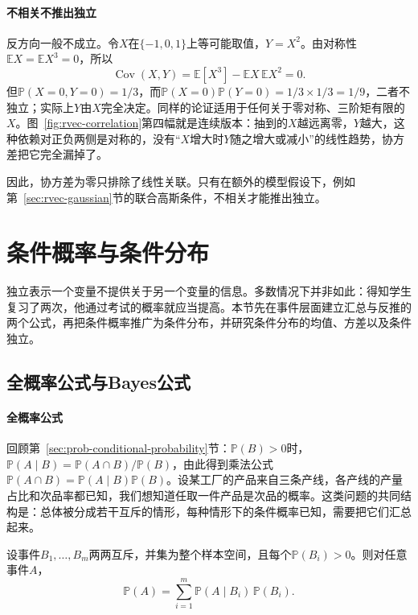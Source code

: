 \paragraph{不相关不推出独立}
反方向一般不成立。令$X$在$\{-1,0,1\}$上等可能取值，$Y=X^2$。由对称性$\mathbb EX=\mathbb EX^3=0$，所以
\[
 \operatorname{Cov}(X,Y)=\mathbb E[X^3]-\mathbb EX\,\mathbb EX^2=0 .
\]
但$\mathbb P(X=0,Y=0)=1/3$，而$\mathbb P(X=0)\mathbb P(Y=0)=1/3\times1/3=1/9$，二者不独立；实际上$Y$由$X$完全决定。同样的论证适用于任何关于零对称、三阶矩有限的$X$。图~\ref{fig:rvec-correlation}第四幅就是连续版本：抽到的$X$越远离零，$Y$越大，这种依赖对正负两侧是对称的，没有“$X$增大时$Y$随之增大或减小”的线性趋势，协方差把它完全漏掉了。

因此，协方差为零只排除了线性关联。只有在额外的模型假设下，例如第~\ref{sec:rvec-gaussian}节的联合高斯条件，不相关才能推出独立。

\section{条件概率与条件分布}
\label{sec:rvec-conditioning}
\label{sec:rv-conditional-distribution}

独立表示一个变量不提供关于另一个变量的信息。多数情况下并非如此：得知学生复习了两次，他通过考试的概率就应当提高。本节先在事件层面建立汇总与反推的两个公式，再把条件概率推广为条件分布，并研究条件分布的均值、方差以及条件独立。

\subsection{全概率公式与Bayes公式}
\label{sec:rvec-bayes-formula}

\paragraph{全概率公式}
回顾第~\ref{sec:prob-conditional-probability}节：$\mathbb P(B)>0$时，$\mathbb P(A\mid B)=\mathbb P(A\cap B)/\mathbb P(B)$，由此得到乘法公式$\mathbb P(A\cap B)=\mathbb P(A\mid B)\mathbb P(B)$。设某工厂的产品来自三条产线，各产线的产量占比和次品率都已知，我们想知道任取一件产品是次品的概率。这类问题的共同结构是：总体被分成若干互斥的情形，每种情形下的条件概率已知，需要把它们汇总起来。

\begin{theorem}[全概率公式]
\label{thm:rvec-total-probability}
设事件$B_1,\ldots,B_m$两两互斥，并集为整个样本空间，且每个$\mathbb P(B_i)>0$。则对任意事件$A$，
\[
 \mathbb P(A)=\sum_{i=1}^m\mathbb P(A\mid B_i)\,\mathbb P(B_i).
\]
\end{theorem}

